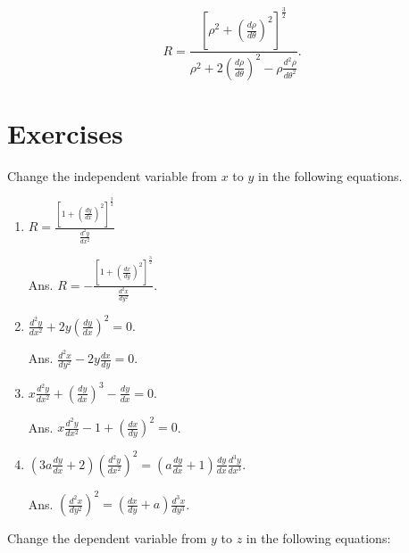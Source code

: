 \begin{example}
{\[
 R 
= \frac{ \left[ \rho^2 + \left( \frac{d\rho}{d\theta} 
\right)^2 \right]^{\frac{3}{2}} }{ \rho^2 + 2 
\left( \frac{d\rho}{d\theta} \right)^2 
- \rho \frac{d^2 \rho}{d\theta^2} }. 
\]

}
\end{example}

\section{Exercises}

Change the independent variable from $x$ to $y$ in the following 
equations.

\begin{enumerate}
\item
$R 
= \frac{ \left[ 1 + \left( \frac{dy}{dx} \right)^2 \right]^{\frac{3}{2}} }{ 
\frac{d^2 y}{dx^2} }$

Ans. 	
$R 
= -\frac{ \left[ 1 + \left( \frac{dx}{dy} \right)^2 
\right]^{\frac{3}{2}} }{ \frac{d^2 x}{dy^2} }$.

\item
$\frac{d^2 y}{dx^2} + 2 y \left( \frac{dy}{dx} \right)^2 = 0$.

Ans. 
$\frac{d^2 x}{dy^2} - 2 y \frac{dx}{dy} = 0$.

\item
$x \frac{d^2 y}{dx^2} + \left( \frac{dy}{dx} \right)^3 
- \frac{dy}{dx} = 0$.

Ans. $x \frac{d^2 y}{dx^2} - 1 + \left( \frac{dx}{dy} \right)^2 = 0$.

\item
$\left( 3 a \frac{dy}{dx} + 2 \right) 
\left( \frac{d^2 y}{dx^2} \right)^2 
= \left( a \frac{dy}{dx} + 1 \right) \frac{dy}{dx} \frac{d^3 y}{dx^3}$. 

Ans. $\left( \frac{d^2 x}{dy^2} \right)^2 
= \left( \frac{dx}{dy} + a \right) \frac{d^3 x}{dy^3}$.

\end{enumerate}

Change the dependent variable from $y$ to $z$ in the following equations:

